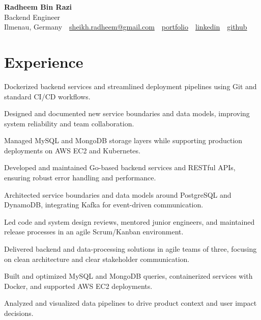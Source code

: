 \documentclass[11pt,a4paper]{resume}
\makeatletter
\newcommand{\Portfolio}{https://radheem.github.io/my-cv}
\newcommand{\PortfolioText}{portfolio}
\newcommand{\GitHub}{https://github.com/radheem}
\newcommand{\LinkedIn}{https://www.linkedin.com/in/radheem-razi}
\newcommand{\Email}{sheikh.radheem@gmail.com}
\makeatother
\begin{document}
\begin{center}
  {\huge\bfseries Radheem Bin Razi}\\[3pt]
  {\large Backend Engineer}\\[6pt]
  \small
  Ilmenau, Germany \,\textbar\,
  \href{mailto:\Email}{\Email} \,\textbar\,
  \href{\Portfolio}{\PortfolioText} \,\textbar\,
  \href{\LinkedIn}{linkedin} \,\textbar\,
  \href{\GitHub}{github}
\end{center}
\vspace{2pt}

\section{Experience}

\bullets
  \item Dockerized backend services and streamlined deployment pipelines using Git and standard CI/CD workflows.
  \item Designed and documented new service boundaries and data models, improving system reliability and team collaboration.
  \item Managed MySQL and MongoDB storage layers while supporting production deployments on AWS EC2 and Kubernetes.
\bulletsend
\vspace{3pt}
\bullets
  \item Developed and maintained Go-based backend services and RESTful APIs, ensuring robust error handling and performance.
  \item Architected service boundaries and data models around PostgreSQL and DynamoDB, integrating Kafka for event-driven communication.
  \item Led code and system design reviews, mentored junior engineers, and maintained release processes in an agile Scrum/Kanban environment.
\bulletsend
\vspace{3pt}
\bullets
  \item Delivered backend and data-processing solutions in agile teams of three, focusing on clean architecture and clear stakeholder communication.
  \item Built and optimized MySQL and MongoDB queries, containerized services with Docker, and supported AWS EC2 deployments.
  \item Analyzed and visualized data pipelines to drive product context and user impact decisions.
\bulletsend
\vspace{3pt}
\end{document}
